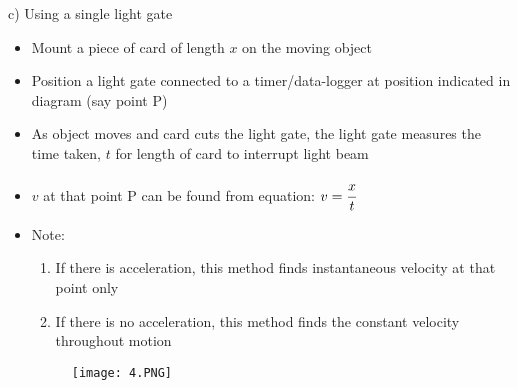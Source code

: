 \documentclass{article}
\begin{document}
\begin{enumerate}
    \begin{flushleft}
    c) Using a single light gate
    \end{flushleft}
    \begin{itemize}
        \item Mount a piece of card of length $x$ on the moving object
\item  Position a light gate connected to a timer/data-logger at position indicated in diagram
(say point P)
\item As object moves and card cuts the light gate, the light gate measures the time taken, $t$
for length of card to interrupt light beam
\item  $v$ at that point P can be found from equation: $v=\cfrac{x}{t}$
\item Note: 
\begin{enumerate}
    \item If there is acceleration, this method finds instantaneous velocity at that
point only
\item If there is no acceleration, this method finds the constant velocity
throughout motion
\end{enumerate}
\begin{figure}[H]
    \centering
    \texttt{[image: 4.PNG]}
\end{figure}
    \end{itemize}
    

\end{enumerate}
\end{document}
